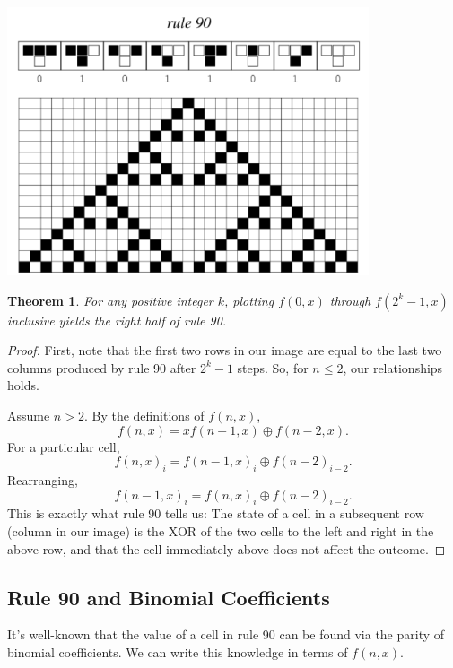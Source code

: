 \documentclass{article}
\newtheorem{theorem}{Theorem}
\newcommand{\xor}{\oplus}
\begin{document}
	\begin{center}
		\includegraphics[width=0.8\textwidth]{rule90.png}
	\end{center}

	\begin{theorem}
		For any positive integer $k$, plotting $f(0,x)$ through $f(2^k - 1,x)$ inclusive yields the right half of rule 90. 
	\end{theorem}
	\begin{proof}
		First, note that the first two rows in our image are equal to the last two columns produced by rule 90 after $2^k - 1$ steps.
		So, for $n \leq 2$, our relationships holds.
		
		Assume $n > 2$.
		By the definitions of $f(n,x)$,
		\begin{equation*}
			f(n,x) = xf(n-1,x) \xor f(n-2,x).
		\end{equation*}
		For a particular cell,
		\begin{equation*}
			f(n,x)_i = f(n-1,x)_i \xor f(n-2)_{i-2}.
		\end{equation*}
		Rearranging,
		\begin{equation*}
			f(n-1,x)_i = f(n,x)_i \xor f(n-2)_{i-2}.
		\end{equation*}
		This is exactly what rule 90 tells us: The state of a cell in a subsequent row (column in our image) is the XOR of the two cells to the left and right in the above row, and that the cell immediately above does not affect the outcome.
	\end{proof}

	\subsection{Rule 90 and Binomial Coefficients}
	It's well-known that the value of a cell in rule 90 can be found via the parity of binomial coefficients.
	We can write this knowledge in terms of $f(n,x)$.
	
\end{document}
